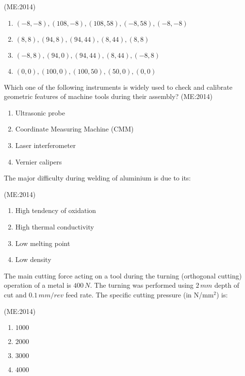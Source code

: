 	    \hfill{(ME:2014)}
    \begin{enumerate}
        \item $(-8, -8), (108, -8), (108, 58), (-8, 58), (-8, -8)$
        \item $(8,8), (94,8), (94,44), (8,44), (8,8)$
        \item $(-8,8), (94,0), (94,44), (8,44), (-8,8)$
        \item $(0,0), (100,0), (100,50), (50,0), (0,0)$
    \end{enumerate}
\vspace{0.5cm}
    \item Which one of the following instruments is widely used to check and calibrate geometric features of machine tools during their assembly? 
	    \hfill{(ME:2014)}
    \begin{multicols}{2}
    \begin{enumerate}
        \item Ultrasonic probe
        \item Coordinate Measuring Machine (CMM)
        \item Laser interferometer
        \item Vernier calipers
    \end{enumerate}
    \end{multicols}

    \item The major difficulty during welding of aluminium is due to its: 

	    \hfill{(ME:2014)}
    \begin{multicols}{2}
    \begin{enumerate}
        \item High tendency of oxidation
        \item High thermal conductivity
        \item Low melting point
        \item Low density
    \end{enumerate}
    \end{multicols}

    \item The main cutting force acting on a tool during the turning (orthogonal cutting) operation of a metal is $400 \, N$. The turning was performed using $2 \, mm$ depth of cut and $0.1 \, mm/rev$ feed rate. The specific cutting pressure (in N/mm$^2$) is:

	    \hfill{(ME:2014)}
    \begin{multicols}{4}
    \begin{enumerate}
        \item $1000$
        \item $2000$
        \item $3000$
        \item $4000$
    \end{enumerate}
    \end{multicols}

